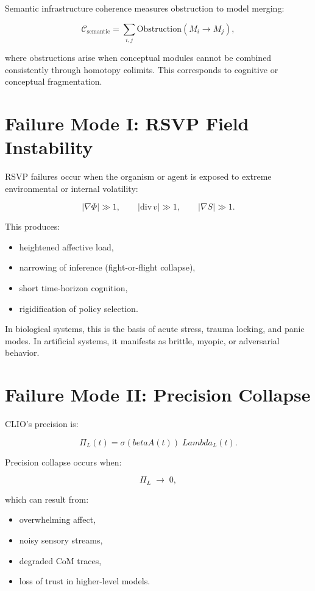 \documentclass[12pt,oneside]{book}
\theoremstyle{plain}
\theoremstyle{definition}
\def\beta{beta}%
\def\Lambda{Lambda}%
\begin{document}
Semantic infrastructure coherence measures obstruction to model merging:

\[
\mathcal{C}_{\mathrm{semantic}}
=
\sum_{i,j}
\mathrm{Obstruction}(M_i \to M_j),
\]

where obstructions arise when conceptual modules cannot be combined
consistently through homotopy colimits.
This corresponds to cognitive or conceptual fragmentation.

\section{Failure Mode I: RSVP Field Instability}

RSVP failures occur when the organism or agent is exposed to extreme
environmental or internal volatility:

\[
|\nabla \Phi| \gg 1,
\qquad
|\mathrm{div}\, v| \gg 1,
\qquad
|\nabla S| \gg 1.
\]

This produces:

\begin{itemize}
    \item heightened affective load,
    \item narrowing of inference (fight-or-flight collapse),
    \item short time-horizon cognition,
    \item rigidification of policy selection.
\end{itemize}

In biological systems, this is the basis of acute stress, trauma locking, and
panic modes.
In artificial systems, it manifests as brittle, myopic, or adversarial
behavior.

\section{Failure Mode II: Precision Collapse}

CLIO's precision is:

\[
\Pi_L(t)
=
\sigma(\beta A(t)) \;\Lambda_L(t).
\]

Precision collapse occurs when:

\[
\Pi_L \;\rightarrow\; 0,
\]

which can result from:

\begin{itemize}
    \item overwhelming affect,
    \item noisy sensory streams,
    \item degraded CoM traces,
    \item loss of trust in higher-level models.
\end{itemize}
\end{document}
